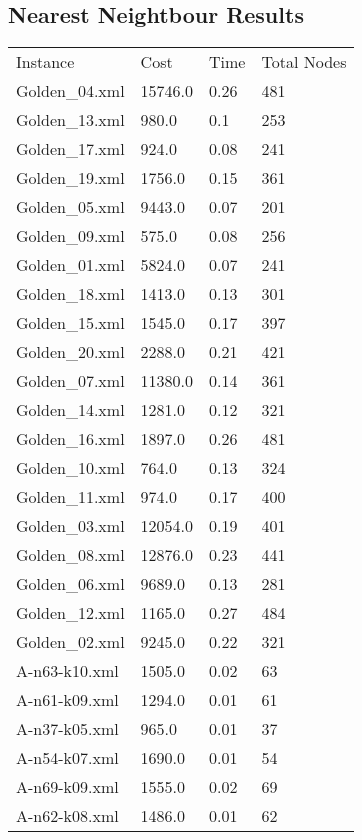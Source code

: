 \documentclass[12pt]{article}
\begin{document}
\newpage
\begin{appendices}

\section{Nearest Neightbour Results}

\begin{table}[]
	\begin{tabular}{llll}
	Instance & Cost & Time & Total Nodes \\
	Golden\_04.xml & 15746.0 & 0.26 & 481 \\
	Golden\_13.xml & 980.0 & 0.1 & 253 \\
	Golden\_17.xml & 924.0 & 0.08 & 241 \\
	Golden\_19.xml & 1756.0 & 0.15 & 361 \\
	Golden\_05.xml & 9443.0 & 0.07 & 201 \\
	Golden\_09.xml & 575.0 & 0.08 & 256 \\
	Golden\_01.xml & 5824.0 & 0.07 & 241 \\
	Golden\_18.xml & 1413.0 & 0.13 & 301 \\
	Golden\_15.xml & 1545.0 & 0.17 & 397 \\
	Golden\_20.xml & 2288.0 & 0.21 & 421 \\
	Golden\_07.xml & 11380.0 & 0.14 & 361 \\
	Golden\_14.xml & 1281.0 & 0.12 & 321 \\
	Golden\_16.xml & 1897.0 & 0.26 & 481 \\
	Golden\_10.xml & 764.0 & 0.13 & 324 \\
	Golden\_11.xml & 974.0 & 0.17 & 400 \\
	Golden\_03.xml & 12054.0 & 0.19 & 401 \\
	Golden\_08.xml & 12876.0 & 0.23 & 441 \\
	Golden\_06.xml & 9689.0 & 0.13 & 281 \\
	Golden\_12.xml & 1165.0 & 0.27 & 484 \\
	Golden\_02.xml & 9245.0 & 0.22 & 321 \\
	A-n63-k10.xml & 1505.0 & 0.02 & 63 \\
	A-n61-k09.xml & 1294.0 & 0.01 & 61 \\
	A-n37-k05.xml & 965.0 & 0.01 & 37 \\
	A-n54-k07.xml & 1690.0 & 0.01 & 54 \\
	A-n69-k09.xml & 1555.0 & 0.02 & 69 \\
	A-n62-k08.xml & 1486.0 & 0.01 & 62 \\

\end{tabular}
\end{table}
\end{appendices}
\end{document}
